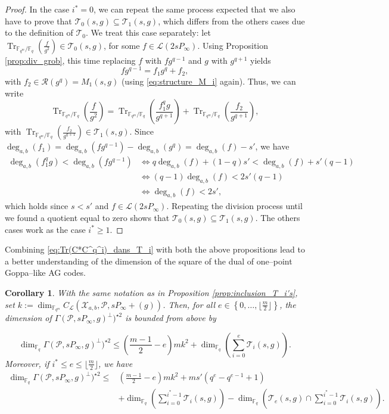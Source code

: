 \documentclass[a4paper]{article}
\newtheorem{coro}[thm]{Corollary}
\theoremstyle{definition}
\theoremstyle{remark}
\newcommand{\calP}{\mathcal{P}}
\newcommand{\calL}{\mathcal{L}}
\newcommand{\calR}{\mathcal{R}}
\newcommand{\calT}{\mathcal{T}}
\newcommand{\calX}{\mathcal{X}}
\newcommand{\fqm}{\mathbb{F}_{q^m}}
\newcommand{\fq}{\mathbb{F}_{q}}
\newcommand{\Tr}[1]{\operatorname{Tr}_{\mathbb{F}_{q^m}/\fq}\left(#1\right)}
\newcommand{\set}[1]{\left\{#1\right\}}
\newcommand{\degab}[1]{\deg_{a,b}\left(#1\right)}
\begin{document}
\begin{proof}
In the case $i^*=0$, we can repeat the same process expected that we also have to prove that $\calT_0(s,g) \subseteq \calT_1(s,g)$, which differs from the others cases due to the definition of $\calT_0$. We treat this case separately: let $\Tr{\frac{f}{g^2}} \in \calT_0(s,g)$, for some $f \in \calL(2sP_\infty)$. Using Proposition \ref{prop:div_grob}, this time replacing $f$ with $fg^{q-1}$ and $g$ with $g^{q+1}$ yields
$$fg^{q-1} = f_1g^q + f_2,$$ with $f_2 \in \calR(g^q) = M_1(s,g)$ (using \eqref{eq:structure_M_i} again).
Thus, we can write
    $$ \Tr{\frac{f}{g^2}} = \Tr{\frac{f_1^qg}{g^{q+1}}}  + \Tr{\frac{f_2}{g^{q+1}}}, $$
with $\Tr{\frac{f_2}{g^{q+1}}} \in \calT_1(s,g)$. Since $\degab{f_1} = \degab{fg^{q-1}} - \degab{g^q} = \degab{f}-s'$, we have 
\begin{align*}
     \degab{f_1^qg} < \degab{fg^{q-1}} & \iff q\degab{f} +(1-q)s' < \degab{f} + s'(q-1)\\
                                               & \iff (q-1)\degab{f} < 2s'(q-1)\\
                                               & \iff \degab{f} < 2s',
\end{align*}
which holds since $s<s'$ and $f \in \calL(2sP_\infty)$. Repeating the division process until we found a quotient equal to zero shows that $\calT_0(s,g) \subseteq \calT_1(s,g)$. The others cases work as the case $i^* \geq 1$.
\end{proof}
Combining \eqref{eq:Tr(C*C^q^i)_dans_T_i} with both the above propositions lead to a better understanding of the dimension of the square of the dual of one--point Goppa--like AG codes. 
\begin{coro} \label{coro:folklore_upper_bound}
 With the same notation as in Proposition \ref{prop:inclusion_T_i's}, set $k:=\dim_{\fqm}C_{\calL}(\calX_{a,b},\calP,sP_\infty+(g))$.
 Then, for all $e \in \set{0,\dots,\lfloor \frac{m}{2} \rfloor}$, the dimension of $\Gamma(\calP,sP_\infty,g)^{\perp})^{\star 2}$ is bounded from above by
 
\[\dim_{\fq} \Gamma(\calP,sP_\infty,g)^{\perp})^{\star 2} \leq   \left(\frac{m-1}{2}-e\right)mk^2+\dim_{\fq}\left(\sum\limits_{i=0}^e \calT_i(s,g) \right). \]
 Moreover, if $i^* \leq e \leq \lfloor \frac{m}{2} \rfloor$, we have 
 \begin{align*}
  \dim_{\fq} \Gamma(\calP,sP_\infty,g)^{\perp})^{\star 2} \leq   & \left(\frac{m-1}{2}-e\right)mk^2 + ms'(q^e-q^{e-1}+1) \\
  & + \dim_{\fq}\left(\sum\limits_{i=0}^{i^*-1} \calT_i(s,g)\right) - \dim_{\fq} \left( \calT_e(s,g) \cap   \sum\limits_{i=0}^{i^*-1} \calT_i(s,g)\right).
 \end{align*}

\end{coro}
\end{document}
